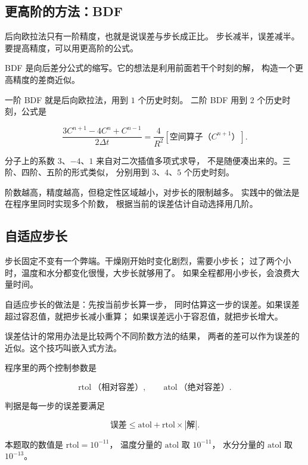 \subsection{更高阶的方法：BDF}

后向欧拉法只有一阶精度，也就是说误差与步长成正比。
步长减半，误差减半。要提高精度，可以用更高阶的公式。

BDF 是向后差分公式的缩写。它的想法是利用前面若干个时刻的解，
构造一个更高精度的差商近似。

一阶 BDF 就是后向欧拉法，用到 $1$ 个历史时刻。
二阶 BDF 用到 $2$ 个历史时刻，公式是

\begin{equation}
\frac{3C^{n+1}-4C^{n}+C^{n-1}}{2\Delta t}
= \frac{4}{R^2}\left[\text{空间算子}（C^{n+1}）\right].
\end{equation}

分子上的系数 $3$、$-4$、$1$ 来自对二次插值多项式求导，
不是随便凑出来的。三阶、四阶、五阶的形式类似，
分别用到 $3$、$4$、$5$ 个历史时刻。

阶数越高，精度越高，但稳定性区域越小，对步长的限制越多。
实践中的做法是在程序里同时实现多个阶数，
根据当前的误差估计自动选择用几阶。

\subsection{自适应步长}

步长固定不变有一个弊端。干燥刚开始时变化剧烈，需要小步长；
过了两个小时，温度和水分都变化很慢，大步长就够用了。
如果全程都用小步长，会浪费大量时间。

自适应步长的做法是：先按当前步长算一步，
同时估算这一步的误差。如果误差超过容忍值，就把步长减小重算；
如果误差远小于容忍值，就把步长增大。

误差估计的常用办法是比较两个不同阶数方法的结果，
两者的差可以作为误差的近似。这个技巧叫嵌入式方法。

程序里的两个控制参数是

\begin{equation}
\mathrm{rtol}\ \text{（相对容差）}, \qquad \mathrm{atol}\ \text{（绝对容差）}.
\end{equation}

判据是每一步的误差要满足

\begin{equation}
\text{误差} \le \mathrm{atol} + \mathrm{rtol}\times\left|\text{解}\right|.
\end{equation}

本题取的数值是 $\mathrm{rtol}=10^{-11}$，
温度分量的 $\mathrm{atol}$ 取 $10^{-11}$，
水分分量的 $\mathrm{atol}$ 取 $10^{-13}$。

